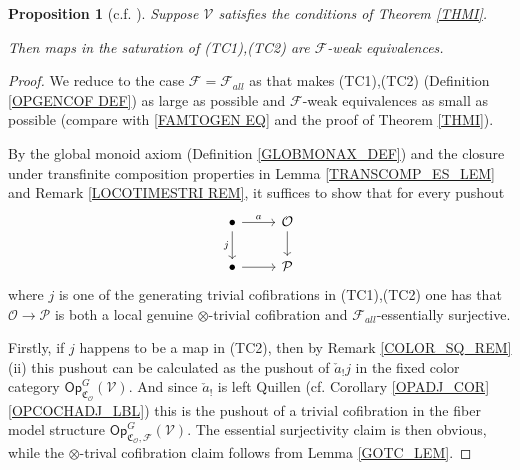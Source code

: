 \documentclass[a4paper,10pt
,draft
]{article}%
\numberwithin{equation}{section}
\numberwithin{figure}{section}
\newtheorem{proposition}[equation]{Proposition}%
\theoremstyle{definition} %
\newcommand{\F}{\ensuremath{\mathcal F}}
\newcommand{\V}{\ensuremath{\mathcal V}}
\renewcommand{\O}{\ensuremath{\mathcal O}}
\renewcommand{\P}{\ensuremath{\mathcal P}}
\newcommand{\1}{\ensuremath{\mathbbm 1}}%
\begin{document}
\begin{proposition}[{c.f. \cite[4.20]{Cav}}]\label{J-CELL_PROP}
      Suppose $\V$ satisfies {\color{blue} the conditions of Theorem \ref{THMI}}.
      
      Then maps in the saturation of (TC1),(TC2) 
      are $\F$-weak equivalences.
\end{proposition}



\begin{proof}
	We reduce to the case
	$\F=\F_{all}$ as that makes (TC1),(TC2) (Definition \ref{OPGENCOF DEF}) as large as possible 
	and $\mathcal{F}$-weak equivalences as small as possible
	(compare with \eqref{FAMTOGEN EQ} and the proof of Theorem \ref{THMI}).
		
	By the global monoid axiom (Definition \ref{GLOBMONAX_DEF}) and
	the closure under transfinite composition properties in Lemma \ref{TRANSCOMP_ES_LEM} and Remark \ref{LOCOTIMESTRI REM},
	it suffices to show that for every pushout
\begin{equation}\label{JUSTAPUSH EQ}
\begin{tikzcd}
	\bullet \ar{r}{a} \arrow{d}[swap]{j}
&
	\O \arrow{d}
\\
	\bullet \ar{r} 
&
	\P
\end{tikzcd}
\end{equation}
	where $j$ is one of the generating trivial cofibrations 
	in (TC1),(TC2) 
	one has that 
	$\O \to \mathcal{P}$ is both a local genuine $\otimes$-trivial cofibration and $\F_{all}$-essentially surjective.

      Firstly, if $j$ happens to be a map in (TC2), then by Remark \ref{COLOR_SQ_REM}(ii)
      this pushout can be calculated as the pushout of $\check{a}_! j$
      in the fixed color category $\mathsf{Op}^{G}_{\mathfrak C_{\O}}(\V)$.
      And since $\check{a}_!$ is left Quillen (cf. Corollary \ref{OPADJ_COR}\ref{OPCOCHADJ_LBL}) %
      this is the pushout of a trivial cofibration in the fiber model structure
      $\mathsf{Op}^{G}_{\mathfrak C_{\O},\F}(\V)$.
	The essential surjectivity claim is then obvious,
	while the $\otimes$-trival cofibration
	claim follows from 
	Lemma \ref{GOTC_LEM}.


\end{proof}
\end{document}
